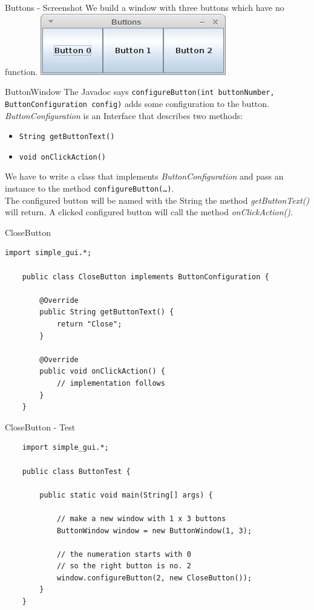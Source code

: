 \begin{frame}{Buttons - Screenshot}
	We build a window with three buttons which have no function.
	\vfill
	\includegraphics[scale=0.4]{res/gui_buttons.png}
\end{frame}

\begin{frame}{ButtonWindow}
	The Javadoc says \texttt{configureButton(int buttonNumber, ButtonConfiguration config)}
	adds some configuration to the button.
	\vfill
	\emph{ButtonConfiguration} is an Interface that describes two methods:
	\begin{itemize}
		\item \texttt{String getButtonText()}
		\item \texttt{void onClickAction()}
	\end{itemize}
	\vfill
	We have to write a class that implements \emph{ButtonConfiguration} and pass an 
	instance to the method \texttt{configureButton(\dots)}. \\
	The configured button will be named with the String the method \emph{getButtonText()} will return.
	A clicked configured button will call the method \emph{onClickAction()}.
\end{frame}

\begin{frame}[fragile]{CloseButton}
	\begin{lstlisting}[basicstyle=\ttfamily\scriptsize, escapechar=!]
	import simple_gui.*;

	public class CloseButton implements ButtonConfiguration {

	    @Override
	    public String getButtonText() {
	        return "Close";
	    }

	    @Override
	    public void onClickAction() {
	        // implementation follows
	    }
	}	
	\end{lstlisting}
\end{frame}

\begin{frame}[fragile]{CloseButton - Test}
	\begin{lstlisting}
	import simple_gui.*;

	public class ButtonTest {

	    public static void main(String[] args) {
		
	        // make a new window with 1 x 3 buttons
	        ButtonWindow window = new ButtonWindow(1, 3);
	        
	        // the numeration starts with 0
	        // so the right button is no. 2
	        window.configureButton(2, new CloseButton());
	    }
	}	
	\end{lstlisting}
\end{frame}

